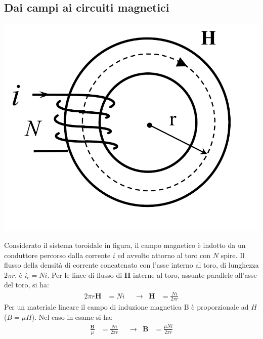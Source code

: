 \documentclass{article}
\begin{document}
\subsection{Dai campi ai circuiti magnetici}
\begin{center}
    \includegraphics[scale=0.27]{Image/Circuiti_magnetici_1.png}
\end{center}
Considerato il sistema toroidale in figura, il campo magnetico è indotto da un conduttore percorso dalla corrente $i$ ed avvolto attorno al toro con $N$ spire. Il flusso della densità di corrente concatenato con l'asse interno al toro, di lunghezza $2 \pi r$, è $i_c = Ni$. Per le linee di flusso di $\mathbf{H}$ interne al toro, assunte parallele all'asse del toro, si ha:
\begin{align*}
    2 \pi r \mathbf{H} &= Ni & &\rightarrow & \mathbf{H} &= \frac{N i}{2 \pi r}
\end{align*}
Per un materiale lineare il campo di induzione magnetica B è proporzionale
ad $H$ ($B = \mu H$). Nel caso in esame si ha:
\begin{align*}
    \frac{\mathbf{B}}{\mu} &= \frac{N i}{2 \pi r} & &\rightarrow & \mathbf{B} &= \frac{\mu N i}{2 \pi r}
\end{align*}
\end{document}
